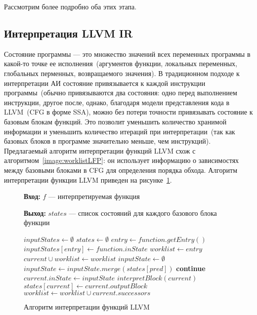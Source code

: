 Рассмотрим более подробно оба этих этапа.

\subsection{Интерпретация LLVM IR}
Состояние программы --- это множество значений всех переменных программы в 
какой-то точке ее исполнения~(аргументов функции, локальных переменных, 
глобальных перменных, возвращаемого значения). В традиционном подходе к 
интерпретации АИ состояние привязывается к каждой инструкции программы~(обычно 
привязываются два состояния: одно перед выполнением инструкции, другое после, 
однако, благодаря модели представления кода в LLVM~(CFG в форме SSA), можно 
без потери точности привязывать состояние к базовым блокам функций. Это 
позволит уменьшить количество хранимой информации и уменьшить количество 
итераций при интерпретации~(так как базовых блоков в программе значительно 
меньше, чем инструкций). Предлагаемый алгоритм интерпретации функций LLVM схож 
с алгоритмом~\ref{image:worklistLFP}: он использует информацию о зависимостях
между базовыми блоками в CFG для определения порядка обхода. Алгоритм 
интерпретации функции LLVM приведен на 
рисунке~\ref{image:functionInterpretation}.

\begin{figure}[h!]
\textbf{Вход:} $f$ --- интерпретируемая функция

\textbf{Выход:} $states$ --- список состояний для каждого базового блока 
функции

\begin{algorithmic}[1]
\State $inputStates \gets \emptyset$
\State $states \gets \emptyset$
\State $entry \gets function.getEntry()$
\State $inputStates[entry] \gets function.inState$
\State $worklist \gets entry$
    \State $current \cup worklist \gets worklist$
    \State $inputState \gets \emptyset$
        \State $inputState \gets inputState.merge(states[pred])$
    \EndFor
        \State \textbf{continue}
    \EndIf
    \State $current.inState \gets inputState$
    \State $interpretBlock(current)$
    \State $states[current] \gets current.outputBlock$
    \State $worklist \gets worklist \cup current.successors$
\EndWhile
\end{algorithmic}
\caption{Алгоритм интерпретации функций LLVM}
\label{image:functionInterpretation}
\end{figure}

